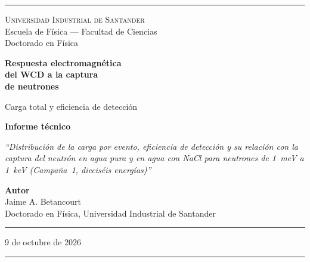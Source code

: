 \documentclass[11pt,a4paper]{article}
\begin{document}
\pagestyle{empty}

\begin{titlepage}
\begin{center}
\vspace*{0.5cm}
\textcolor{reglaColor}{\rule{\linewidth}{1.2pt}}

\vspace{1.3cm}
{\Large\scshape Universidad Industrial de Santander}\\[0.2cm]
{\large Escuela de Física --- Facultad de Ciencias}\\[0.2cm]
{\large Doctorado en Física}

\vspace{2.2cm}
{\Huge\bfseries\color{tituloColor} Respuesta electromagnética\\[0.3cm] del WCD a la captura\\[0.3cm] de neutrones}

\vspace{1.2cm}
{\Large Carga total y eficiencia de detección}

\vspace{1.4cm}
{\large\textbf{Informe técnico}}

\vspace{0.6cm}
\begin{minipage}{0.82\linewidth}
\centering
\textit{``Distribución de la carga por evento, eficiencia de detección y su relación con la captura del neutrón en agua pura y en agua con NaCl para neutrones de 1~meV a 1~keV (Campaña~1, dieciséis energías)''}
\end{minipage}

\vfill
{\large\textbf{Autor}}\\[0.15cm]
Jaime A. Betancourt\\[0.1cm]
Doctorado en Física, Universidad Industrial de Santander

\vspace{1.2cm}
\textcolor{reglaColor}{\rule{0.5\linewidth}{0.6pt}}

\vspace{1cm}
9 de octubre de 2026

\vspace{1cm}
\textcolor{reglaColor}{\rule{\linewidth}{1.2pt}}
\end{center}
\end{titlepage}

\pagestyle{plain}
\end{document}
